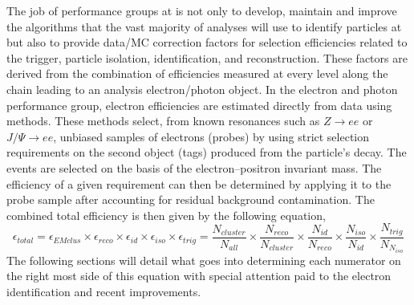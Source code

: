 The job of performance groups at \atlas is not only to develop, maintain and improve the algorithms that the vast majority of analyses will use to identify particles at \ATLAS but also to provide data/MC correction factors for selection efficiencies related to the trigger, particle isolation, identification, and reconstruction.
These factors are derived from the combination of efficiencies measured at every level along the chain leading to an analysis electron/photon object.  
In the electron and photon performance group, electron efficiencies are estimated directly from data using \tnp methods.
These methods select, from known resonances such as $Z \rightarrow ee$ or $J/\Psi \rightarrow ee$, unbiased samples of electrons (probes) by using strict selection requirements on the second object (tags) produced from the particle’s decay.
The events are selected on the basis of the electron–positron invariant mass.
The efficiency of a given requirement can then be determined by applying it to the probe sample after accounting for residual background contamination.
The combined total efficiency is then given by the following equation,
\begin{equation*}
\epsilon_{total}=\epsilon_{EMclus}\times\epsilon_{reco}\times\epsilon_{id}\times\epsilon_{iso}\times\epsilon_{trig} = \frac{N_{cluster}}{N_{all}}\times\frac{N_{reco}}{N_{cluster}}\times\frac{N_{id}}{N_{reco}}\times\frac{N_{iso}}{N_{id}}\times\frac{N_{trig}}{N_{N_{iso}}}
\end{equation*}
The following sections will detail what goes into determining each numerator on the right most side of this equation with special attention paid to the electron identification and recent improvements.